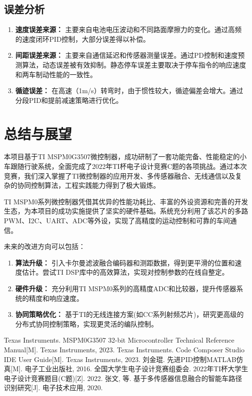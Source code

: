\documentclass[UTF8]{ctexart}
\begin{document}
\subsection{误差分析}
\begin{enumerate}
    \item \textbf{速度误差来源：} 主要来自电池电压波动和不同路面摩擦力的变化。通过高频的速度闭环PID控制，大部分误差得以补偿。
    \item \textbf{间距误差来源：} 主要来自通信延迟和传感器测量误差。通过PD控制和速度预测算法，动态误差被有效抑制。静态停车误差主要取决于停车指令的响应速度和两车制动性能的一致性。
    \item \textbf{循迹误差：} 在高速（1m/s）转弯时，由于惯性较大，循迹偏差会增大。通过分段PID和提前减速策略进行优化。
\end{enumerate}

\section{总结与展望}

本项目基于TI MSPM0G3507微控制器，成功研制了一套功能完备、性能稳定的小车跟随行驶系统，全面完成了2022年TI杯电子设计竞赛C题的各项挑战。通过本次竞赛，我们深入掌握了TI微控制器的应用开发、多传感器融合、无线通信以及复杂的协同控制算法，工程实践能力得到了极大锻炼。

TI MSPM0系列微控制器凭借其优异的性能功耗比、丰富的外设资源和完善的开发生态，为本项目的成功实施提供了坚实的硬件基础。系统充分利用了该芯片的多路PWM、I2C、UART、ADC等外设，实现了高精度的运动控制和可靠的车间通信。

未来的改进方向可以包括：
\begin{enumerate}
    \item \textbf{算法升级：} 引入卡尔曼滤波融合编码器和测距数据，得到更平滑的位置和速度估计。尝试TI DSP库中的高效算法，实现对控制参数的在线自整定。
    \item \textbf{硬件升级：} 充分利用TI MSPM0系列的高精度ADC和比较器，提升传感器系统的精度和响应速度。
    \item \textbf{协同策略优化：} 基于TI的无线连接方案(如CC系列射频芯片)，研究更高级的分布式协同控制策略，实现更灵活的编队控制。
\end{enumerate}

\begin{thebibliography}{99}
     Texas Instruments. MSPM0G3507 32-bit Microcontroller Technical Reference Manual[M]. Texas Instruments, 2023.
     Texas Instruments. Code Composer Studio IDE User Guide[M]. Texas Instruments, 2023.
     刘金琨. 先进PID控制MATLAB仿真[M]. 电子工业出版社, 2016.
     全国大学生电子设计竞赛组委会. 2022年TI杯大学生电子设计竞赛题目(C题)[Z]. 2022.
     张文, 等. 基于多传感器信息融合的智能车路径识别研究[J]. 电子技术应用, 2020.
\end{thebibliography}
\end{document}
